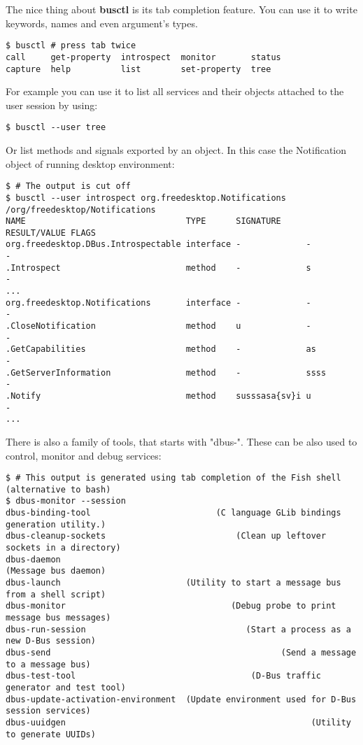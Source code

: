 \documentclass[a4paper,10.5pt]{article}
\begin{document}
The nice thing about \textbf{busctl} is its tab completion feature. You can use it to write keywords, names and even argument's types.
\begin{verbatim}
$ busctl # press tab twice
call     get-property  introspect  monitor       status
capture  help          list        set-property  tree
\end{verbatim}

For example you can use it to list all services and their objects attached to the user session by using:
\begin{verbatim}
$ busctl --user tree
\end{verbatim}

Or list methods and signals exported by an object. In this case the Notification object of running desktop environment:
\begin{verbatim}
$ # The output is cut off
$ busctl --user introspect org.freedesktop.Notifications /org/freedesktop/Notifications
NAME                                TYPE      SIGNATURE     RESULT/VALUE FLAGS
org.freedesktop.DBus.Introspectable interface -             -            -
.Introspect                         method    -             s            -
... 
org.freedesktop.Notifications       interface -             -            -
.CloseNotification                  method    u             -            -
.GetCapabilities                    method    -             as           -
.GetServerInformation               method    -             ssss         -
.Notify                             method    susssasa{sv}i u            -
...
\end{verbatim}

There is also a family of tools, that starts with "dbus-". These can be also used to control, monitor and debug services:
\begin{verbatim}
$ # This output is generated using tab completion of the Fish shell (alternative to bash)
$ dbus-monitor --session
dbus-binding-tool                         (C language GLib bindings generation utility.)
dbus-cleanup-sockets                          (Clean up leftover sockets in a directory)
dbus-daemon                                                         (Message bus daemon)
dbus-launch                         (Utility to start a message bus from a shell script)
dbus-monitor                                 (Debug probe to print message bus messages)
dbus-run-session                                (Start a process as a new D-Bus session)
dbus-send                                              (Send a message to a message bus)
dbus-test-tool                                   (D-Bus traffic generator and test tool)
dbus-update-activation-environment  (Update environment used for D-Bus session services)
dbus-uuidgen                                                 (Utility to generate UUIDs)
\end{verbatim}
\end{document}
